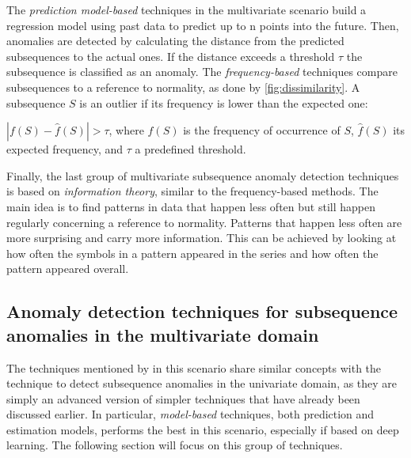 The \textit{prediction model-based} techniques in the multivariate scenario build a regression model using past data to predict up to n points into the future. Then, anomalies are detected by calculating the distance from the predicted subsequences to the actual ones. If the distance exceeds a threshold $\tau$ the subsequence is classified as an anomaly. The 
 \textit{frequency-based} techniques compare subsequences to a reference to normality, as done by  \autoref{fig:dissimilarity}. A subsequence $S$ is an
outlier if its frequency is lower than the expected one:
\begin{definition}\label{def:frequency-based}
    $|f(S) - \hat{f}(S)| > \tau $, where $f(S)$ is the frequency of occurrence of $S$, $\hat{f}(S)$ its expected frequency, and $\tau$ a predefined threshold.
\end{definition}
Finally, the last group of multivariate subsequence anomaly detection techniques is based on \textit{information theory}, similar to the frequency-based methods. The main idea is to find patterns in data that happen less often but still happen regularly concerning a reference to normality. Patterns that happen less often are more surprising and carry more information. This can be achieved by looking at how often the symbols in a pattern appeared in the series and how often the pattern appeared overall. 

\subsection{Anomaly detection techniques for subsequence anomalies in the multivariate domain}
\label{ss:ad-subsequence-multivariate}
The techniques mentioned by \cite{blazquez2020review} in this scenario share similar concepts with the technique to detect subsequence anomalies in the univariate domain, as they are simply an advanced version of simpler techniques that have already been discussed earlier. In particular, \textit{model-based} techniques, both prediction and estimation models, performs the best in this scenario, especially if based on deep learning. The following section will focus on this group of techniques.


